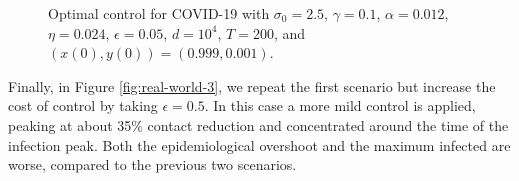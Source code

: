 \documentclass[english,12pt,letter]{article}
\newcommand{\Rnot}{\sigma_0}
\begin{document}
\begin{figure}
    \centering
    \caption{Optimal control for COVID-19 with $\Rnot=2.5$, $\gamma=0.1$,
                $\alpha=0.012$, $\eta=0.024$, $\epsilon=0.05$, $d=10^4$, $T=200$, and $(x(0),y(0)) =
                (0.999,0.001)$.\label{fig:real-world-2}}
\end{figure}

Finally, in Figure \ref{fig:real-world-3}, we repeat the first scenario
but increase the cost of control by taking $\epsilon=0.5$.
In this case a more mild control is applied, peaking at about
35\% contact reduction and concentrated around the time of the
infection peak.  Both the epidemiological overshoot and the maximum
infected are worse, compared to the previous two scenarios.
\end{document}
